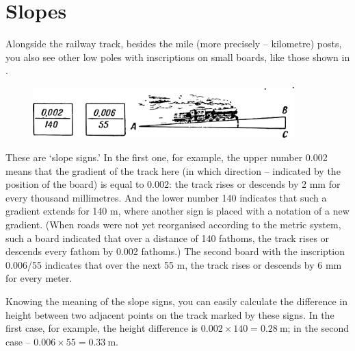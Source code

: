 \section{Slopes}
\label{sec-4.3}

Alongside the railway track, besides the mile (more precisely -- kilometre) posts, you also see other low poles with inscriptions on small boards, like those shown in .

\begin{figure}[h!]
\centering
\includegraphics[width=0.9\textwidth]{figures/ch-04/fig-081.pdf}
\end{figure}


These are `slope signs.' In the first one, for example, the upper number 0.002 means that the gradient of the track here (in which direction -- indicated by the position of the board) is equal to 0.002: the track rises or descends by 2 mm for every thousand millimetres. And the lower number 140 indicates that such a gradient extends for 140 m, where another sign is placed with a notation of a new gradient. (When roads were not yet reorganised according to the metric system, such a board indicated that over a distance of 140 fathoms, the track rises or descends every fathom by 0.002 fathoms.) The second board with the inscription 0.006/55 indicates that over the next 55 m, the track rises or descends by 6 mm for every meter.

Knowing the meaning of the slope signs, you can easily calculate the difference in height between two adjacent points on the track marked by these signs. In the first case, for example, the height difference is $0.002 \times 140 = \SI{0.28}{\meter}$; in the second case -- $0.006 \times 55 = \SI{0.33}{\meter}$.

